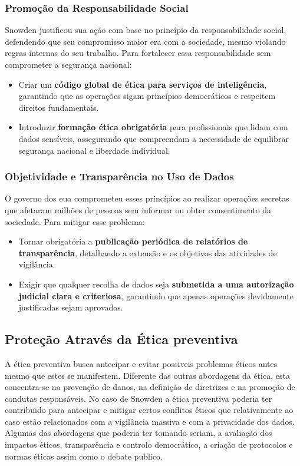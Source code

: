 \documentclass[a4paper,12pt]{article}
\begin{document}
\subsubsection*{Promoção da Responsabilidade Social}
Snowden justificou sua ação com base no princípio da responsabilidade social, defendendo que seu compromisso maior era com a sociedade, mesmo violando regras internas do seu trabalho\cite{teresa}. Para fortalecer essa responsabilidade sem comprometer a segurança nacional:
\begin{itemize}
    \item Criar um \textbf{código global de ética para serviços de inteligência}, garantindo que as operações sigam princípios democráticos e respeitem direitos fundamentais.
    \item Introduzir \textbf{formação ética obrigatória} para profissionais que lidam com dados sensíveis, assegurando que compreendam a necessidade de equilibrar segurança nacional e liberdade individual.
\end{itemize}

\subsubsection*{Objetividade e Transparência no Uso de Dados}
O governo dos \acrshort{eua} comprometeu esses princípios ao realizar operações secretas que afetaram milhões de pessoas sem informar ou obter consentimento da sociedade. Para mitigar esse problema:
\begin{itemize}
    \item Tornar obrigatória a \textbf{publicação periódica de relatórios de transparência}, detalhando a extensão e os objetivos das atividades de vigilância.
    \item Exigir que qualquer recolha de dados seja \textbf{submetida a uma autorização judicial clara e criteriosa}, garantindo que apenas operações devidamente justificadas sejam aprovadas.\cite{pilati}
\end{itemize}


\subsection{Proteção Através da Ética preventiva}
A ética preventiva busca antecipar e evitar possiveis problemas éticos antes mesmo que estes se manifestem. Diferente das outras abordagens da ética, esta concentra-se na prevenção de danos, na definição de diretrizes e na promoção de condutas responsáveis. No caso de Snowden a ética preventiva poderia ter contribuido para antecipar e mitigar certos conflitos éticos que relativamente ao caso estão relacionados com a vigilância massiva e com a privacidade dos dados. Algumas das abordagens que poderia ter tomando seriam, a avaliação dos impactos éticos, transparência e controlo democrático, a criação de protocolos e normas éticas assim como o debate publico.
\end{document}
